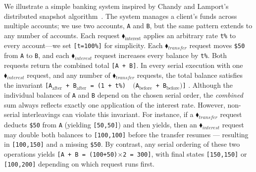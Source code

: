 We illustrate a simple banking system inspired by Chandy and Lamport’s distributed snapshot algorithm~\cite{ChLa85}.  The system manages a client’s funds across multiple accounts; we use two accounts, \texttt{A} and \texttt{B}, but the same pattern extends to any number of accounts.  Each request {\color{ForestGreen}$\blacklozenge_\text{interest}$} applies an arbitrary rate \texttt{t\%} to every account—we set \texttt{[t=100\%]} for simplicity.
%
Each {\color{ForestGreen}$\blacklozenge_{\mathit{transfer}}$} request moves \texttt{\$50} from \texttt{A} to \texttt{B}, and each {\color{ForestGreen}$\blacklozenge_{\mathit{interest}}$} request increases every balance by \texttt{t\%}.  Both requests return the combined total \texttt{[A + B]}.
%
In every serial execution with one {\color{ForestGreen}$\blacklozenge_{\mathit{interest}}$} request, and any number of {\color{ForestGreen}$\blacklozenge_{\mathit{transfer}}$} requests, the total balance satisfies the invariant
\texttt{[A$_{\text{after}}$ + B$_{\text{after}}$ = (1 + t\%) \,$\bigl($A$_{\text{before}}$ + B$_{\text{before}}\bigr)$]}
.
%
%
Although the individual balances of \texttt{A} and \texttt{B} depend on the chosen serial order, the \textit{combined} sum always reflects exactly one application of the interest rate.
%
However, non-serial interleavings can violate this invariant.  For instance, if a {\color{ForestGreen}$\blacklozenge_{\mathit{transfer}}$} request deducts \texttt{\$50} from \texttt{A} (yielding \texttt{[50,50]}) and then yields, then an {\color{ForestGreen}$\blacklozenge_{\mathit{interest}}$} request may double both balances to \texttt{[100,100]} before the transfer resumes --- resulting in \texttt{[100,150]} and a missing \texttt{\$50}.  By contrast, any serial ordering of these two operations yields \texttt{[A + B = (100+50)$\times$2 = 300]}, with final states \texttt{[150,150]} or \texttt{[100,200]} depending on which request runs first.
%
%
